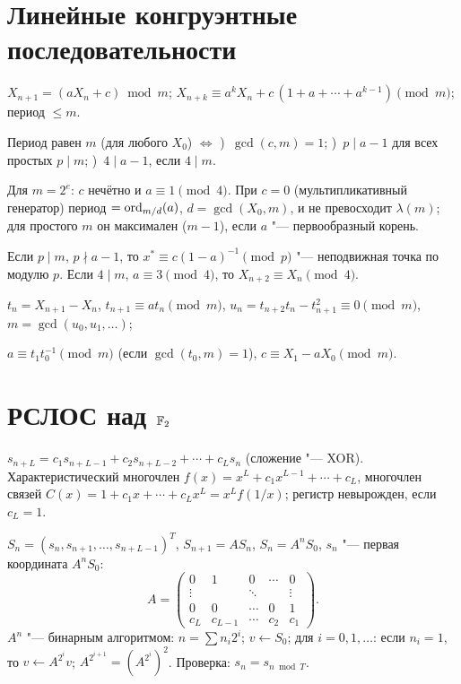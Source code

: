 \documentclass{ca-handout}
\begin{document}
\makehandouttitle

\section{Линейные конгруэнтные последовательности}
$X_{n+1} = (a X_n + c) \bmod m$; \quad
$X_{n+k} \equiv a^k X_n + c\,(1 + a + \cdots + a^{k-1}) \pmod m$; период $\le m$.

\begin{reminder}[title={Теорема о максимальном периоде (Халл"--~Добелл, Кнут~A)}]
Период равен $m$ (для любого $X_0$) $\iff$
)~$\gcd(c, m) = 1$; )~$p \mid a - 1$ для всех простых $p \mid m$;
)~$4 \mid a - 1$, если $4 \mid m$.
\par\smallskip
Для $m = 2^e$: $c$ нечётно и $a \equiv 1 \pmod 4$. При $c = 0$ (мультипликативный генератор)
период $= \operatorname{ord}_{m/d}(a)$, $d = \gcd(X_0, m)$, и не превосходит $\lambda(m)$; для простого $m$ он
максимален ($m - 1$), если $a$ "--- первообразный корень.
\end{reminder}

Если $p \mid m$, $p \nmid a - 1$, то $x^* \equiv c(1 - a)^{-1} \pmod p$ "--- неподвижная точка по
модулю $p$. Если $4 \mid m$, $a \equiv 3 \pmod 4$, то $X_{n+2} \equiv X_n \pmod 4$.

\begin{reminder}[title={Восстановление параметров по выходам $X_0, X_1, \dots$}]
$t_n = X_{n+1} - X_n$, \quad $t_{n+1} \equiv a t_n \pmod m$, \quad
$u_n = t_{n+2} t_n - t_{n+1}^2 \equiv 0 \pmod m$, \quad $m = \gcd(u_0, u_1, \dots)$;
\par
$a \equiv t_1 t_0^{-1} \pmod m$ (если $\gcd(t_0, m) = 1$), \quad $c \equiv X_1 - a X_0 \pmod m$.
\end{reminder}

\section{РСЛОС над $\mathbb{F}_{2}$}
$s_{n+L} = c_1 s_{n+L-1} + c_2 s_{n+L-2} + \cdots + c_L s_n$ (сложение "--- XOR).
Характеристический многочлен $f(x) = x^L + c_1 x^{L-1} + \cdots + c_L$, многочлен связей
$C(x) = 1 + c_1 x + \cdots + c_L x^L = x^L f(1/x)$; регистр невырожден, если $c_L = 1$.

\begin{reminder}[title={Матричная форма}]
$S_n = (s_n, s_{n+1}, \dots, s_{n+L-1})^T$, \quad $S_{n+1} = A S_n$, \quad $S_n = A^n S_0$, \quad
$s_n$ "--- первая координата $A^n S_0$:
\[
  A = \begin{pmatrix}
    0 & 1 & 0 & \cdots & 0\\
    \vdots & & \ddots & & \vdots\\
    0 & 0 & \cdots & 0 & 1\\
    c_L & c_{L-1} & \cdots & c_2 & c_1
  \end{pmatrix}.
\]
$A^n$ "--- бинарным алгоритмом: $n = \sum n_i 2^i$; $v \gets S_0$; для $i = 0, 1, \dots$: если
$n_i = 1$, то $v \gets A^{2^i} v$; $A^{2^{i+1}} = (A^{2^i})^2$. Проверка: $s_n = s_{n \bmod T}$.
\end{reminder}
\end{document}
